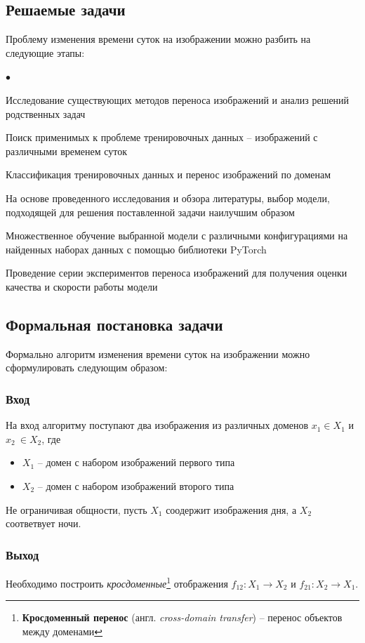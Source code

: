 \documentclass[11pt,a4paper]{extarticle}
\newenvironment{compactlist}{
\begin{list}{{$\bullet$}}{
\setlength\partopsep{0pt}
\setlength\parskip{0pt}
\setlength\parsep{0pt}
\setlength\topsep{0pt}
\setlength\itemsep{0pt}
}}{
\end{list}
}
\begin{document}
	\subsection{Решаемые задачи}
		Проблему изменения времени суток на изображении можно разбить на следующие этапы:

		\begin{compactlist}
			\item Исследование существующих методов переноса изображений и анализ решений родственных задач
			\item Поиск применимых к проблеме тренировочных данных -- изображений с различными временем суток
			\item Классификация тренировочных данных и перенос изображений по доменам 
			\item На основе проведенного исследования и обзора литературы, выбор модели, подходящей для решения поставленной задачи
			наилучшим образом
			\item Множественное обучение выбранной модели с различными конфигурациями на найденных наборах данных с помощью библиотеки PyTorch
			\item Проведение серии экспериментов переноса изображений для получения оценки качества и скорости работы модели 
		\end{compactlist}

	\subsection{Формальная постановка задачи}\label{intro_problem}
		Формально алгоритм изменения времени суток на изображении можно сформулировать следующим образом:

		\subsubsection*{Вход}
			На вход алгоритму поступают два изображения из различных доменов \(x_{1} \in X_{1}\)  и \(x_{2}\ \in X_{2}\), где
			\begin{itemize}
				\item \(X_{1}\) -- домен с набором изображений первого типа
				\item \(X_{2}\) -- домен с набором изображений второго типа
			\end{itemize}
			Не ограничивая общности, пусть \(X_{1}\) соодержит изображения дня, а \(X_{2}\) соответвует ночи.
		\subsubsection*{Выход}
			Необходимо построить \textit{кросдоменные}\footnote{
				\textbf{Кросдоменный перенос} (англ. \textit{cross-domain transfer}) -- перенос объектов между доменами 
			} отображения \(f_{12}\!: X_{1} \longrightarrow X_{2}\) и \(f_{21}\!: X_{2} \longrightarrow X_{1}\).
			
\end{document}
